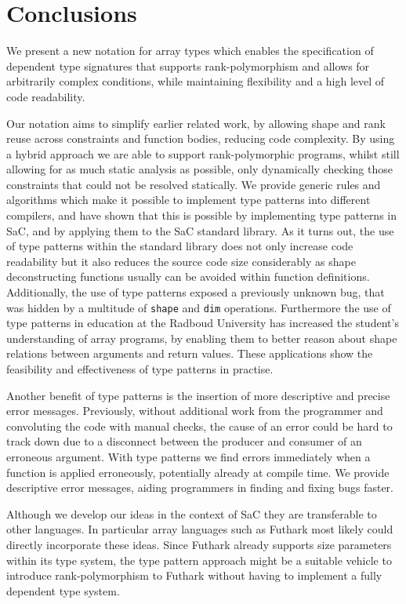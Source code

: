 
\section{Conclusions}

We present a new notation for array types which enables the specification of dependent type signatures that supports rank-polymorphism and allows for arbitrarily complex conditions, while maintaining flexibility and a high level of code readability.

Our notation aims to simplify earlier related work, by allowing shape and rank reuse across constraints and function bodies, reducing code complexity.
By using a hybrid approach we are able to support rank-polymorphic programs, whilst still allowing for as much static analysis as possible, only dynamically checking those constraints that could not be resolved statically.
We provide generic rules and algorithms which make it possible to implement type patterns into different compilers, and have shown that this is possible by implementing type patterns in SaC, and by applying them to the SaC standard library.
As it turns out, the use of type patterns within the standard library does not only increase code readability but it also reduces the source code size considerably as shape deconstructing functions usually can be avoided within function definitions.
Additionally, the use of type patterns exposed a previously unknown bug, that was hidden by a multitude of \texttt{shape} and \texttt{dim} operations.
Furthermore the use of type patterns in education at the Radboud University has increased the student's understanding of array programs, by enabling them to better reason about shape relations between arguments and return values.
These applications show the feasibility and effectiveness of type patterns in practise.

Another benefit of type patterns is the insertion of more descriptive and precise error messages.
Previously, without additional work from the programmer and convoluting the code with manual checks, the cause of an error could be hard to track down due to a disconnect between the producer and consumer of an erroneous argument.
With type patterns we find errors immediately when a function is applied erroneously, potentially already at compile time.
We provide descriptive error messages, aiding programmers in finding and fixing bugs faster.

Although we develop our ideas in the context of SaC they are transferable
to other languages. In particular array languages such as Futhark most likely could directly incorporate these ideas.
Since Futhark already supports size parameters within its type system, the type pattern approach might be a suitable vehicle to introduce rank-polymorphism to Futhark without having to implement a fully dependent type system.

